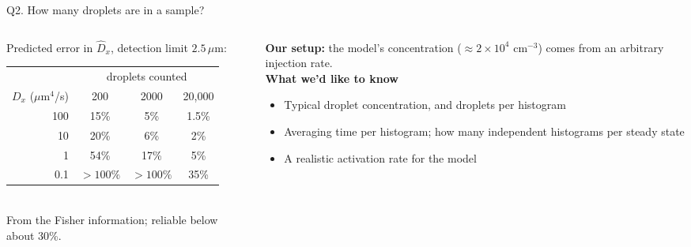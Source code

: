 \documentclass[aspectratio=169,10pt]{beamer}
\newcommand{\um}{\,\mu\mathrm{m}}
\newcommand{\ask}[1]{\textcolor{askcol}{\textbf{#1}}}
\begin{document}
\begin{frame}{Q2. How many droplets are in a sample?}
\begin{columns}[T]
\begin{column}{0.5\textwidth}
Predicted error in $\hat D_x$, detection limit $2.5\um$:\\[0.4em]
\begin{tabular}{@{}rccc@{}}
\toprule
& \multicolumn{3}{c}{droplets counted}\\
\cmidrule(lr){2-4}
$D_x$ ($\mu$m$^4$/s) & 200 & 2000 & 20{,}000\\\midrule
100 & 15\% & 5\% & 1.5\%\\
10 & 20\% & 6\% & 2\%\\
1 & 54\% & 17\% & 5\%\\
0.1 & $>100\%$ & $>100\%$ & 35\%\\\bottomrule
\end{tabular}\\[0.3em]
{\footnotesize From the Fisher information; reliable below about 30\%.}
\end{column}
\begin{column}{0.48\textwidth}
\textbf{Our setup:} the model's concentration ($\approx2\times10^4$ cm$^{-3}$) comes from an arbitrary injection rate.\\[0.6em]
\ask{What we'd like to know}
\begin{itemize}
\item Typical droplet concentration, and droplets per histogram
\item Averaging time per histogram; how many independent histograms per steady state
\item A realistic activation rate for the model
\end{itemize}
\end{column}
\end{columns}
\end{frame}
\end{document}
